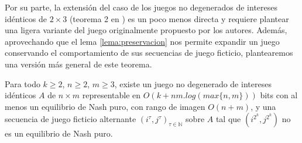 Por su parte, la extensión del caso de los juegos no degenerados de intereses idénticos de $2 \times 3$ (teorema 2 en \cite{brandt:rate:convergence}) es un poco menos directa y requiere plantear una ligera variante del juego originalmente propuesto por los autores. Además, aprovechando que el lema \ref{lema:preservacion} nos permite expandir un juego conservando el comportamiento de sus secuencias de juego ficticio, plantearemos una versión más general de este teorema. 

\begin{theorem} \label{teorema:afp:velocidad:nondegen}
    Para todo $k \geq 2$, $n\geq 2$, $m\geq 3$, existe un juego no degenerado de intereses idénticos $A$ de $n\times m$ representable en $O(k+nm. log(max\{n,m\}))$ bits con al menos un equilibrio de Nash puro, con rango de imagen $O(n+m)$, y una secuencia de juego ficticio alternante $(i^\tau, j^\tau)_{\tau \in \mathbb{N}}$ sobre $A$ tal que $(i^{2^k}, j^{2^k})$ no es un equilibrio de Nash puro.
\end{theorem}
